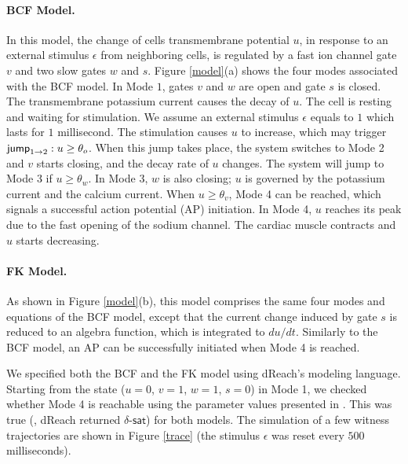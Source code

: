 \paragraph{BCF Model.} 
In this model, the change of cells transmembrane potential $u$, in response to an external stimulus $\epsilon$ from neighboring cells, is regulated by a fast ion channel gate $v$ and two slow gates $w$ and $s$.
Figure \ref{model}(a) shows the four modes associated with the BCF model. In Mode $1$, gates $v$ and $w$ are open and gate $s$ is closed. The transmembrane potassium current causes the decay of $u$. The cell is resting and waiting for stimulation. We assume an external stimulus $\epsilon$ equals to $1$ which lasts for $1$ millisecond. The stimulation causes $u$ to increase, which may trigger $\mathsf{jump}_{1 \rightarrow 2}: u \geq \theta_o$. When this jump takes place, the system switches to Mode 2 and $v$ starts closing, and the decay rate of $u$ changes. The system will jump to Mode 3 if $u \geq \theta_w$. In Mode 3, $w$ is also closing; $u$ is governed by the potassium current and the calcium current. When $u \geq \theta_v$, Mode 4 can be reached, which signals a successful action potential (AP) initiation. In Mode 4, $u$ reaches its peak due to the fast opening of the sodium channel. The cardiac muscle contracts and $u$ starts decreasing. 

\paragraph{FK Model.} 
As shown in Figure \ref{model}(b), this model comprises the same four modes and equations of the BCF model, except that the current change induced by gate $s$ is reduced to an algebra function, which is integrated to $du/dt$. Similarly to the BCF model, an AP can be successfully initiated when Mode 4 is reached. 

We specified both the BCF and the FK model using dReach's modeling language. Starting from the state ($u = 0$, $v = 1$, $w = 1$, $s = 0$) in Mode 1, we checked whether Mode 4 is reachable using the parameter values presented in \cite{orovio08}. This was true (\ie, dReach returned $\delta$-$\mathsf{sat}$) for both models. 
The simulation of a few witness trajectories are shown in Figure \ref{trace} (the stimulus $\epsilon$ was reset every $500$ milliseconds).


